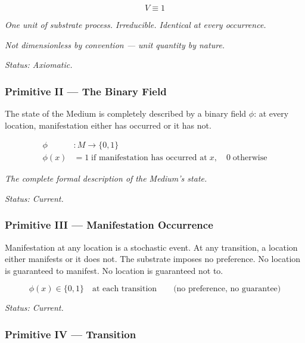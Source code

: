 \documentclass[12pt, letterpaper]{article}
\begin{document}
\begin{formulabox}
\begin{equation}
V \equiv 1
\tag{2}
\end{equation}
\centerline{\textit{One unit of substrate process. Irreducible. Identical at every occurrence.}}
\centerline{\textit{Not dimensionless by convention --- unit quantity by nature.}}
\end{formulabox}

\emph{Status: Axiomatic.}
\subsubsection{Primitive II --- The Binary Field}
\label{sec:org193df54}

The state of the Medium is completely described by a binary field \(\phi\): at
every location, manifestation either has occurred or it has not.

\begin{formulabox}
\begin{align}
\phi &: M \to \{0, 1\} \tag{3} \\
\phi(x) &= 1 \;\text{if manifestation has occurred at}\; x, \quad 0 \;\text{otherwise} \tag{4}
\end{align}
\centerline{\textit{The complete formal description of the Medium's state.}}
\end{formulabox}

\emph{Status: Current.}
\subsubsection{Primitive III --- Manifestation Occurrence}
\label{sec:org6fba729}

Manifestation at any location is a stochastic event. At any transition, a
location either manifests or it does not. The substrate imposes no preference.
No location is guaranteed to manifest. No location is guaranteed not to.

\begin{formulabox}
\begin{equation}
\phi(x) \in \{0, 1\} \quad \text{at each transition} \qquad \text{(no preference, no guarantee)}
\tag{5}
\end{equation}
\end{formulabox}

\emph{Status: Current.}
\subsubsection{Primitive IV --- Transition}
\label{sec:org1e9e6d6}
\end{document}
